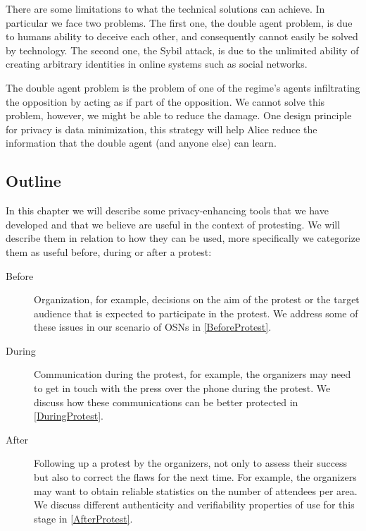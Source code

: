 There are some limitations to what the technical solutions can achieve.
In particular we face two problems.
The first one, the double agent problem, is due to humans ability to deceive 
each other, and consequently cannot easily be solved by technology.
The second one, the Sybil attack, is due to the unlimited ability of creating 
arbitrary identities in online systems such as social networks.

\label{DoubleAgentProblem}
The double agent problem is the problem of one of the regime's agents 
infiltrating the opposition by acting as if part of the opposition.
We cannot solve this problem, however, we might be able to reduce the damage.
One design principle for privacy is data minimization, this strategy will help 
Alice reduce the information that the double agent (and anyone else) can learn.

\label{SybilAttacks}


\subsection{Outline}
\label{Outline}

In this chapter we will describe some privacy-enhancing tools that we have 
developed and that we believe are useful in the context of protesting.
We will describe them in relation to how they can be used, more specifically we 
categorize them as useful before, during or after a protest:
\begin{description}
  \item[Before]
    Organization, for example, decisions on the aim of the protest or the 
    target audience that is expected to participate in the protest.
    We address some of these issues in our scenario of \acp{OSN} in 
    \cref{BeforeProtest}.

  \item[During]
    Communication during the protest, for example, the organizers may need to 
    get in touch with the press over the phone during the protest.
    We discuss how these communications can be better protected in 
    \cref{DuringProtest}.

  \item[After]
    Following up a protest by the organizers, not only to assess their success 
    but also to correct the flaws for the next time.  For example, the 
    organizers may want to obtain reliable statistics on the number of 
    attendees per area.
    We discuss different authenticity and verifiability properties of use for 
    this stage in \cref{AfterProtest}.
\end{description}

